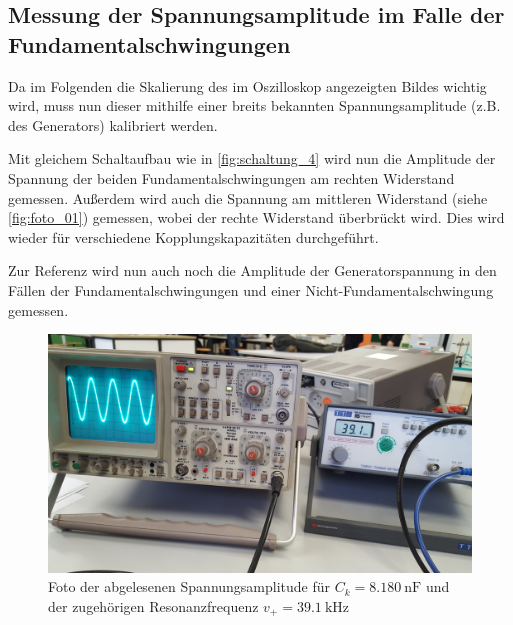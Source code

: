 \subsection{Messung der Spannungsamplitude im Falle der Fundamentalschwingungen}
\label{sec:amplituden}

Da im Folgenden die Skalierung des im Oszilloskop angezeigten Bildes wichtig wird, muss nun dieser mithilfe einer breits bekannten Spannungsamplitude (z.B. des Generators) kalibriert werden.

Mit gleichem Schaltaufbau wie in \autoref{fig:schaltung_4} wird nun die Amplitude der Spannung der beiden Fundamentalschwingungen am rechten Widerstand gemessen. Außerdem wird auch die Spannung am mittleren Widerstand (siehe \autoref{fig:foto_01}) gemessen, wobei der rechte Widerstand überbrückt wird.
Dies wird wieder für verschiedene Kopplungskapazitäten durchgeführt.

Zur Referenz wird nun auch noch die Amplitude der Generatorspannung in den Fällen der Fundamentalschwingungen und einer Nicht-Fundamentalschwingung gemessen.

\begin{figure}
    \centering
    \includegraphics[width=\textwidth/2]{images/foto_10.jpg}
    \caption{Foto der abgelesenen Spannungsamplitude für $C_k = \SI{8.180}{\nano\farad}$ und der zugehörigen Resonanzfrequenz $v_+ = \SI{39.1}{\kilo\hertz}$}
    \label{fig:foto_10}
\end{figure}